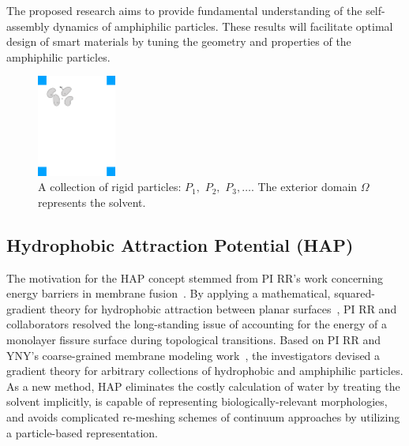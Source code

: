 %
The proposed research aims to provide fundamental understanding of the self-assembly dynamics of amphiphilic particles. These results will facilitate optimal design of smart materials by
tuning the geometry and properties of the amphiphilic particles.


\begin{figure}
  \vspace{-20pt}
\centerline{\includegraphics[width=0.23\textwidth]{figures/BG_fig1.pdf}}
\caption{ \footnotesize
A collection of rigid particles: $P_1,$ $P_2,$ $P_3, \ldots$. The
exterior domain $\Omega$ represents the solvent.}
  \label{fig:domain}
\end{figure}
\subsection{Hydrophobic Attraction Potential (HAP)}
\label{sec:HAP}
The motivation for the HAP concept stemmed from PI RR's work concerning
energy barriers in membrane
fusion~\cite{RyKlYaCo16,Chetal16}. By applying a mathematical, squared-gradient
theory for hydrophobic attraction between planar
surfaces~\cite{Eriksson1989,Lum1999,Menshikov2017,Marcelja1977}, PI RR
and collaborators resolved the long-standing issue of accounting for the
energy of a monolayer fissure surface during topological transitions.
Based on PI RR and YNY's coarse-grained membrane modeling
work~\cite{Fu2017}, the investigators devised a gradient theory for
arbitrary collections of hydrophobic and
amphiphilic particles. As a new method, HAP eliminates the costly calculation
of water by treating the solvent implicitly, is capable of representing
biologically-relevant morphologies, and avoids complicated
re-meshing schemes of continuum approaches by utilizing a particle-based
representation.

